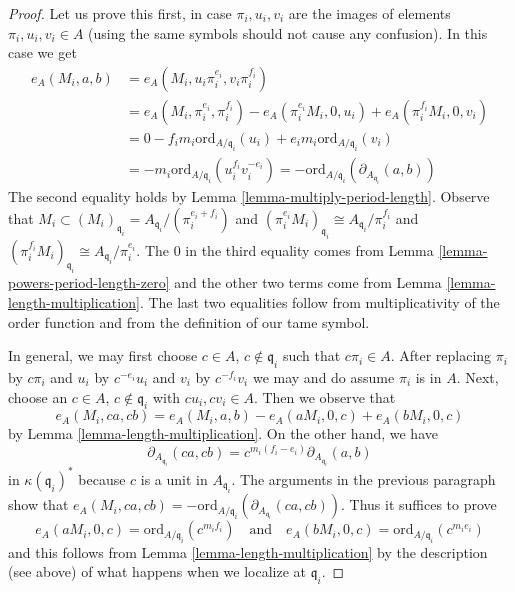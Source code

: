 \documentclass[10pt,a4paper]{amsart}
\theoremstyle{plain}
\theoremstyle{definition}
\theoremstyle{remark}
\numberwithin{equation}{subsection}
\begin{document}
\begin{proof}
\medskip\noindent
Let us prove this first, in case $\pi_i, u_i, v_i$ are the images
of elements $\pi_i, u_i, v_i \in A$ (using the same symbols
should not cause any confusion). In this case we get
\begin{align*}
e_A(M_i, a, b) & =
e_A(M_i, u_i\pi_i^{e_i}, v_i\pi_i^{f_i}) \\
& =
e_A(M_i, \pi_i^{e_i}, \pi_i^{f_i}) -
e_A(\pi_i^{e_i}M_i, 0, u_i) +
e_A(\pi_i^{f_i}M_i, 0, v_i) \\
& =
0 -
f_im_i\text{ord}_{A/\mathfrak q_i}(u_i) +
e_im_i\text{ord}_{A/\mathfrak q_i}(v_i) \\
& =
-m_i\text{ord}_{A/\mathfrak q_i}(u_i^{f_i}v_i^{-e_i}) =
-\text{ord}_{A/\mathfrak q_i}(\partial_{A_{\mathfrak q_i}}(a, b))
\end{align*}
The second equality holds by Lemma \ref{lemma-multiply-period-length}.
Observe that
$M_i \subset (M_i)_{\mathfrak q_i} = A_{\mathfrak q_i}/(\pi_i^{e_i + f_i})$
and
$(\pi_i^{e_i}M_i)_{\mathfrak q_i} \cong A_{\mathfrak q_i}/\pi_i^{f_i}$ and
$(\pi_i^{f_i}M_i)_{\mathfrak q_i} \cong A_{\mathfrak q_i}/\pi_i^{e_i}$.
The $0$ in the third equality comes from
Lemma \ref{lemma-powers-period-length-zero}
and the other two terms come from
Lemma \ref{lemma-length-multiplication}.
The last two equalities follow from multiplicativity of
the order function and from the definition of our tame symbol.

\medskip\noindent
In general, we may first choose $c \in A$, $c \not \in \mathfrak q_i$
such that $c\pi_i \in A$. After replacing $\pi_i$ by $c\pi_i$
and $u_i$ by $c^{-e_i}u_i$ and $v_i$ by $c^{-f_i}v_i$
we may and do assume $\pi_i$ is in $A$.
Next, choose an $c \in A$, $c \not \in \mathfrak q_i$
with $cu_i, cv_i \in A$. Then we observe that
$$
e_A(M_i, ca, cb) = e_A(M_i, a, b) - e_A(aM_i, 0, c) + e_A(bM_i, 0, c)
$$
by Lemma \ref{lemma-length-multiplication}.
On the other hand, we have
$$
\partial_{A_{\mathfrak q_i}}(ca, cb) =
c^{m_i(f_i - e_i)}\partial_{A_{\mathfrak q_i}}(a, b)
$$
in $\kappa(\mathfrak q_i)^*$ because $c$ is a unit in $A_{\mathfrak q_i}$.
The arguments in the previous paragraph show that
$e_A(M_i, ca, cb) = -
\text{ord}_{A/\mathfrak q_i}(\partial_{A_{\mathfrak q_i}}(ca, cb))$.
Thus it suffices to prove
$$
e_A(aM_i, 0, c) = \text{ord}_{A/\mathfrak q_i}(c^{m_if_i})
\quad\text{and}\quad
e_A(bM_i, 0, c) = \text{ord}_{A/\mathfrak q_i}(c^{m_ie_i})
$$
and this follows from Lemma \ref{lemma-length-multiplication}
by the description (see above)
of what happens when we localize at $\mathfrak q_i$.
\end{proof}
\end{document}
